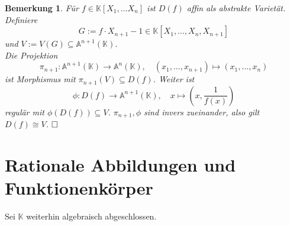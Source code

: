 \documentclass[11pt]{book}
\newtheorem{remark}[theorem]{Bemerkung}
\theoremstyle{nonumberbreak}
\newenvironment{pr}[1][]{\ifthenelse{\equal{#1}{}}{\proof}{\proof[#1]}\rm}{\endproof}
\begin{document}
\begin{spacing}{1.3}
\begin{remark} %
Für $f \in \mathbb{K}[X_1, \ldots X_n]$ ist $D(f)$ affin als abstrakte Varietät.\\
\begin{pr}
Definiere
$$G:= f \cdot X_{n+1} -1 \in \mathbb{K}[X_1, \ldots, X_n , X_{n+1}]$$
und $V:=V(G) \subseteq \mathbb{A}^{n+1}(\mathbb{K})$.\\
Die Projektion $$\pi_{n+1}: \mathbb{A}^{n+1}(\mathbb{K}) \longrightarrow  \mathbb{A}^n(\mathbb{K}), \quad (x_1, \ldots, x_{n+1}) \mapsto (x_1, \ldots, x_n)$$
ist Morphismus mit $\pi_{n+1}(V) \subseteq D(f)$. Weiter ist 
$$\phi: D(f) \longrightarrow \mathbb{A}^{n+1}(\mathbb{K}), \quad x \mapsto \left(x, \frac{1}{f(x)}\right)$$
regulär mit $\phi(D(f)) \subseteq V$. $\pi_{n+1}, \phi$ sind invers zueinander, also gilt $D(f) \cong V$. $\hfill \Box$
\end{pr}
\end{remark}





\renewcommand*\thesection{§ \arabic{section}\quad}
\section{Rationale Abbildungen und Funktionenkörper} %
\renewcommand*\thesection{\arabic{section}}

Sei $\mathbb{K}$ weiterhin algebraisch abgeschlossen.


\end{spacing}
\end{document}
